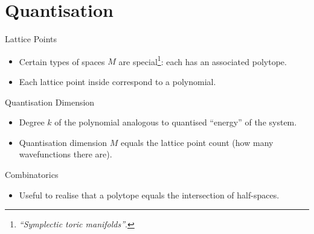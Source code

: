 \section{Quantisation}

\begin{frame}{Lattice Points}

    \begin{itemize}
       \item Certain types of spaces $M$ are special\footnote{\emph{``Symplectic toric manifolds''}.}: each has an associated polytope.
       \item Each lattice point inside correspond to a polynomial.
    \end{itemize}

\end{frame}

\begin{frame}{Quantisation Dimension}

    \begin{itemize}
    \item Degree $k$ of the polynomial analogous to quantised ``energy'' of the system.
    \item Quantisation dimension $M$ equals the lattice point count (how many wavefunctions there are).
    \end{itemize}

\end{frame}

\begin{frame}{Combinatorics}

    \begin{itemize}
       \item Useful to realise that a polytope equals the intersection of half-spaces.
    \end{itemize}

\end{frame}